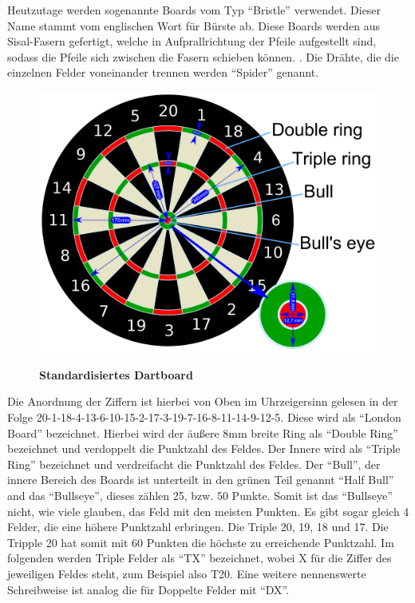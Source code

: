 Heutzutage werden sogenannte Boards vom Typ "`Bristle"' verwendet. Dieser Name stammt vom englischen Wort für Bürste ab. Diese Boards werden aus Sisal-Fasern gefertigt, welche in Aufprallrichtung der Pfeile aufgestellt sind, sodass die Pfeile sich zwischen die Fasern schieben können. \autocite[6]{dph2015}. Die Drähte, die die einzelnen Felder voneinander trennen werden "`Spider"' genannt.
\begin{figure}
\includegraphics[width=\textwidth]{media/Dartboard_Abmessungen}\\
\caption{\textbf{Standardisiertes Dartboard\cite{Board2016}}
}
\label{Fig:dartboard}
\end{figure}

Die Anordnung der Ziffern ist hierbei von Oben im Uhrzeigersinn gelesen in der Folge 20-1-18-4-13-6-10-15-2-17-3-19-7-16-8-11-14-9-12-5. Diese wird als "`London Board"' bezeichnet. Hierbei wird der äußere 8mm breite Ring als "`Double Ring"' bezeichnet und verdoppelt die Punktzahl des Feldes. Der Innere wird als "`Triple Ring"' bezeichnet und verdreifacht die Punktzahl des Feldes. Der "`Bull"', der innere Bereich des Boards ist unterteilt in den grünen Teil genannt "`Half Bull"' and das "`Bullseye"', dieses zählen 25, bzw. 50 Punkte. 
Somit ist das "`Bullseye"' nicht, wie viele glauben, das Feld mit den meisten Punkten. Es gibt sogar gleich 4 Felder, die eine höhere Punktzahl erbringen. Die Triple 20, 19, 18 und 17. Die Tripple 20 hat somit mit 60 Punkten die höchste zu erreichende Punktzahl. Im folgenden werden Triple Felder als "`TX"' bezeichnet, wobei X für die Ziffer des jeweiligen Feldes steht, zum Beispiel also T20. Eine weitere nennenswerte Schreibweise ist analog die für Doppelte Felder mit "`DX"'. 

